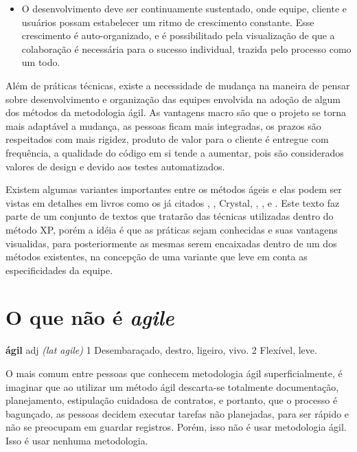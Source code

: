 \begin{itemize}
\item O desenvolvimento deve ser continuamente sustentado, onde equipe, cliente e usuários possam estabelecer um ritmo de crescimento constante. Esse crescimento é auto-organizado, e é possibilitado pela visualização de que a colaboração é necessária para o sucesso individual, trazida pelo processo como um todo.
\end{itemize}

Além de práticas técnicas, existe a necessidade de mudança na maneira de pensar sobre desenvolvimento e organização das equipes envolvida na adoção de algum dos métodos da metodologia ágil. As vantagens macro são que o projeto se torna mais adaptável a mudança, as pessoas ficam mais integradas, os prazos são respeitados com mais rigidez, produto de valor para o cliente é entregue com frequência, a qualidade do código em si tende a aumentar, pois são considerados valores de design e devido aos testes automatizados. 

Existem algumas variantes importantes entre os métodos ágeis e elas podem ser vistas em detalhes em livros como os já citados \cite{XPExplained}, \cite{DSDM}, {Crystal}, \cite{ASD}, \cite {ScrumXP},  e \cite{Lean}. Este texto faz parte de um conjunto de textos que tratarão das técnicas utilizadas dentro do método XP, porém a idéia é que as práticas sejam conhecidas e suas vantagens visualidas, para posteriormente as mesmas serem encaixadas dentro de um dos métodos existentes, na concepção de uma variante que leve em conta as especificidades da equipe.

\section {O que não é \textit{agile}}

\begin{center}\textbf{ágil} adj \textit{(lat agile)} 1 Desembaraçado, destro, ligeiro, vivo. 2 Flexível, leve.  \end{center}

O mais comum entre pessoas que conhecem metodologia ágil superficialmente, é imaginar que ao utilizar um método ágil descarta-se totalmente documentação, planejamento, estipulação cuidadosa de contratos, e portanto, que o processo é bagunçado, as pessoas decidem executar tarefas não planejadas, para ser rápido e não se preocupam em guardar registros. Porém, isso não é usar metodologia ágil. Isso é usar nenhuma metodologia. 


